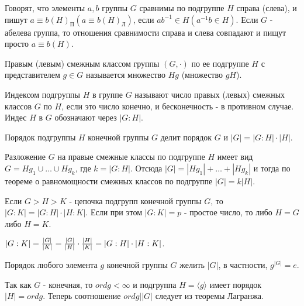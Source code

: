 \begin{defs}
  Говорят, что элементы $a,b$ группы $G$ сравнимы по подгруппе $H$ справа (слева), и пишут 	$a \equiv b (H)_\text{П} (a \equiv b (H)_\text{Л})$, если
  $ab^{-1} \in H (a^{-1}b \in H)$.
  Если $G$ - абелева группа, то отношения сравнимости справа и слева совпадают и пищут просто $a \equiv b (H)$.
\end{defs}

\begin{defs}
  Правым (левым) смежным классом группы $(G,\cdot)$ по ее подгруппе $H$ с представителем $g \in G$ называется множество
  $Hg$ (множество $gH$).
\end{defs}

\begin{defs}
  Индексом подгруппы $H$ в группе $G$ называют число правых (левых) смежных классов $G$ по $H$, если это число конечно,
  и бесконечность - в противном случае. Индес $H$ в $G$ обозначают через $|G : H|$.
\end{defs}

\begin{proofs}
	Порядок подгруппы $H$ конечной группы $G$ делит порядок $G$ и $|G| = |G : H| \cdot |H|$.
	\begin{dokvo}
    Разложение $G$ на правые смежные классы по подгруппе $H$ имеет вид $G = Hg_1 \cup \ldots \cup Hg_k$,
    где $k=|G : H|$. Отсюда $|G| = |Hg_1| + \ldots + |Hg_k|$ и тогда по теореме о равномощности смежных классов
    по подгруппе $|G| = k|H|$.
	\end{dokvo}
\end{proofs}

\begin{sledsv}
  Если $G > H > K$ - цепочка подгрупп конечной группы $G$, то $|G : K| = |G : H| \cdot |H : K|$.
  Если при этом $|G : K| = p$ - простое число, то либо $H = G$ либо $H = K$.
  \begin{dokvo}
    $|G : K| = \frac{\left| G\right|}{\left| K\right|} = \frac{\left| G\right|}{\left| H\right|}\cdot \frac{\left| H\right|}{\left| K\right|} = |G : H|\cdot|H : K|$.
  \end{dokvo}
\end{sledsv}

\begin{sledsv}
  Порядок любого элемента $g$ конечной группы $G$ желить $|G|$, в частности, $g^{|G|} = e$.
  \begin{dokvo}
    Так как $G$ - конечная, то $ord g < \infty$ и подгруппа $H = \langle g \rangle$ имеет
    порядок $|H| = ord g$. Теперь соотношение $ord g | |G|$ следует из теоремы Лагранжа.
  \end{dokvo}
\end{sledsv}

